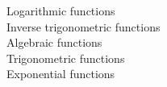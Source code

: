 \documentclass[preview]{standalone}
\begin{document}
Logarithmic functions\\Inverse trigonometric functions\\Algebraic functions\\Trigonometric functions\\Exponential functions\\
\end{document}
